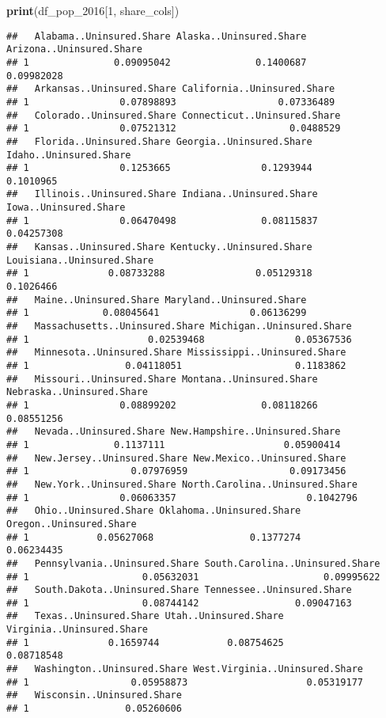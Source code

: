 \documentclass[
]{article}
\newenvironment{Shaded}{\begin{snugshade}}{\end{snugshade}}
\newcommand{\DecValTok}[1]{\textcolor[rgb]{0.00,0.00,0.81}{#1}}
\newcommand{\FunctionTok}[1]{\textcolor[rgb]{0.13,0.29,0.53}{\textbf{#1}}}
\newcommand{\NormalTok}[1]{#1}
\begin{document}
\begin{Shaded}
\begin{Highlighting}[]
\FunctionTok{print}\NormalTok{(df\_pop\_2016[}\DecValTok{1}\NormalTok{, share\_cols])}
\end{Highlighting}
\end{Shaded}

\begin{verbatim}
##   Alabama..Uninsured.Share Alaska..Uninsured.Share Arizona..Uninsured.Share
## 1               0.09095042               0.1400687               0.09982028
##   Arkansas..Uninsured.Share California..Uninsured.Share
## 1                0.07898893                  0.07336489
##   Colorado..Uninsured.Share Connecticut..Uninsured.Share
## 1                0.07521312                    0.0488529
##   Florida..Uninsured.Share Georgia..Uninsured.Share Idaho..Uninsured.Share
## 1                0.1253665                0.1293944              0.1010965
##   Illinois..Uninsured.Share Indiana..Uninsured.Share Iowa..Uninsured.Share
## 1                0.06470498               0.08115837            0.04257308
##   Kansas..Uninsured.Share Kentucky..Uninsured.Share Louisiana..Uninsured.Share
## 1              0.08733288                0.05129318                  0.1026466
##   Maine..Uninsured.Share Maryland..Uninsured.Share
## 1             0.08045641                0.06136299
##   Massachusetts..Uninsured.Share Michigan..Uninsured.Share
## 1                     0.02539468                0.05367536
##   Minnesota..Uninsured.Share Mississippi..Uninsured.Share
## 1                 0.04118051                    0.1183862
##   Missouri..Uninsured.Share Montana..Uninsured.Share Nebraska..Uninsured.Share
## 1                0.08899202               0.08118266                0.08551256
##   Nevada..Uninsured.Share New.Hampshire..Uninsured.Share
## 1               0.1137111                     0.05900414
##   New.Jersey..Uninsured.Share New.Mexico..Uninsured.Share
## 1                  0.07976959                  0.09173456
##   New.York..Uninsured.Share North.Carolina..Uninsured.Share
## 1                0.06063357                       0.1042796
##   Ohio..Uninsured.Share Oklahoma..Uninsured.Share Oregon..Uninsured.Share
## 1            0.05627068                 0.1377274              0.06234435
##   Pennsylvania..Uninsured.Share South.Carolina..Uninsured.Share
## 1                    0.05632031                      0.09995622
##   South.Dakota..Uninsured.Share Tennessee..Uninsured.Share
## 1                    0.08744142                 0.09047163
##   Texas..Uninsured.Share Utah..Uninsured.Share Virginia..Uninsured.Share
## 1              0.1659744            0.08754625                0.08718548
##   Washington..Uninsured.Share West.Virginia..Uninsured.Share
## 1                  0.05958873                     0.05319177
##   Wisconsin..Uninsured.Share
## 1                 0.05260606
\end{verbatim}
\end{document}
